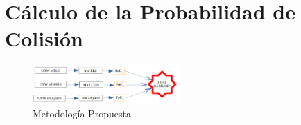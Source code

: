 \section{C\'alculo de la Probabilidad de Colisi\'on}
\begin{figure}[!h]
\centering
 \includegraphics[width=0.5\textwidth]{imagenes/metodoARxCODE}
 \caption{Metodolog\'ia Propuesta}
 \label{fig:metodoARxCODE}
\end{figure}

